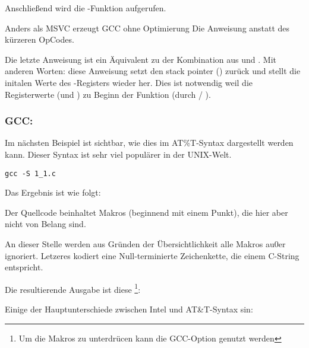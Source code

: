 Anschließend wird die \printf-Funktion aufgerufen.

Anders als MSVC erzeugt GCC ohne Optimierung Die Anweisung  anstatt des kürzeren OpCodes.

Die letzte Anweisung \LEAVE ist ein Äquivalent zu der Kombination aus  und .
Mit anderen Worten: diese Anweisung setzt den \gls{stack pointer} (\ESP) zurück und stellt die initalen Werte des \EBP-Registers wieder her.
Dies ist notwendig weil die Registerwerte (\ESP und \EBP) zu Beginn der Funktion (durch  / ).

\subsubsection{GCC: \ATTSyntax}
\label{ATT_syntax}

Im nächsten Beispiel ist sichtbar, wie dies im AT\%T-Syntax dargestellt werden kann.
Dieser Syntax ist sehr viel populärer in der UNIX-Welt.

\begin{lstlisting}[caption=Das Beispiel kompiliert mit GCC 4.7.3]
gcc -S 1_1.c
\end{lstlisting}

Das Ergebnis ist wie folgt:



Der Quellcode beinhaltet Makros (beginnend mit einem Punkt), die hier aber nicht von Belang sind.

An dieser Stelle werden aus Gründen der Übersichtlichkeit alle Makros au0er 
ignoriert. Letzeres kodiert eine Null-terminierte Zeichenkette, die einem C-String entspricht.

Die resultierende Ausgabe ist diese
\footnote{Um die  Makros zu unterdrücen kann die GCC-Option  genutzt werden}:



\myindex{\ATTSyntax}
\myindex{\IntelSyntax}
Einige der Hauptunterschiede zwischen Intel und AT\&T-Syntax sin:


